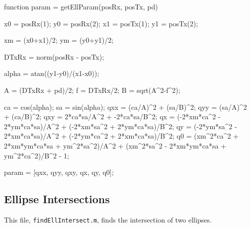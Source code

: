 \documentclass[12pt,openany,a4paper]{book}
\begin{document}
\begin{spverbatim}
function param = getEllParam(posRx, posTx, pd)
%
%

x0 = posRx(1); y0 = posRx(2);
x1 = posTx(1); y1 = posTx(2);

xm = (x0+x1)/2;
ym = (y0+y1)/2;

DTxRx = norm(posRx - posTx);

alpha = atan((y1-y0)/(x1-x0));

A = (DTxRx + pd)/2;
f = DTxRx/2;
B = sqrt(A^2-f^2);

ca = cos(alpha);
sa = sin(alpha);
qxx = (ca/A)^2 + (sa/B)^2;
qyy = (sa/A)^2 + (ca/B)^2;
qxy = 2*ca*sa/A^2 + -2*ca*sa/B^2;
qx = (-2*xm*ca^2 - 2*ym*ca*sa)/A^2 + (-2*xm*sa^2 + 2*ym*ca*sa)/B^2;
qy = (-2*ym*sa^2 - 2*xm*ca*sa)/A^2 + (-2*ym*ca^2 + 2*xm*ca*sa)/B^2;
q0 = (xm^2*ca^2 + 2*xm*ym*ca*sa + ym^2*sa^2)/A^2 + (xm^2*sa^2 - 2*xm*ym*ca*sa + ym^2*ca^2)/B^2 - 1; 
    
param = [qxx, qyy, qxy, qx, qy, q0];
\end{spverbatim}

\subsection{Ellipse Intersections}
\label{app:ellInt}
This file, \verb+findEllIntersect.m+, finds the intersection of two ellipses.
\end{document}
